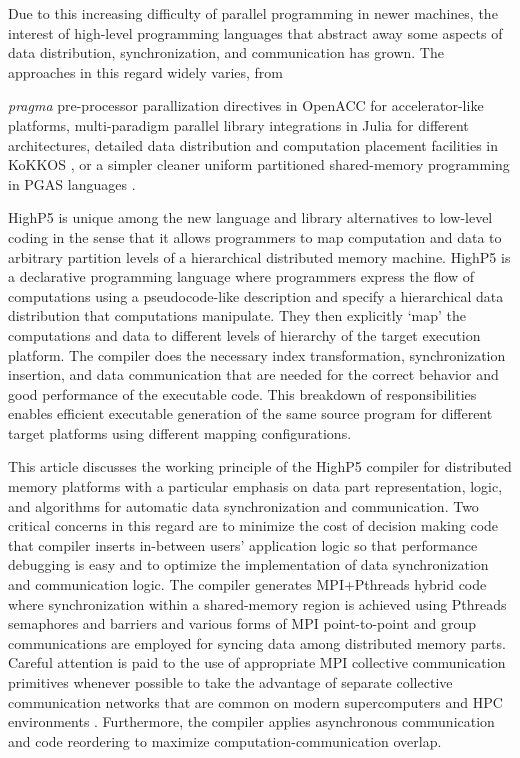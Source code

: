 \documentclass[ASNA,twocolumn]{USG} %
\begin{document}
Due to this increasing difficulty of parallel programming in newer machines, the interest of high-level programming languages that abstract away some aspects of data distribution, synchronization, and communication has grown. The approaches in this regard widely varies, from {\textit{pragma} pre-processor parallization directives in OpenACC \citep{farber2016parallel} for accelerator-like platforms, multi-paradigm parallel library integrations in Julia \citep{lin2021comparing} for different architectures, detailed data distribution and computation placement facilities in KoKKOS \citep{trott2021kokkos}, or a simpler cleaner uniform partitioned shared-memory programming in PGAS languages \citep{Yelick:2007:PPU:1278177.1278183}. 
	
    
HighP5 \citep{yanhaona2024highp5} is unique among the new language and library alternatives to low-level coding in the sense that it allows programmers to map computation and data to arbitrary partition levels of a hierarchical distributed memory machine. HighP5 is a declarative programming language where programmers express the flow of computations using a pseudocode-like description and specify a hierarchical data distribution that computations manipulate. They then explicitly `map' the computations and data to different levels of hierarchy of the target execution platform. The compiler does the necessary index transformation, synchronization insertion, and data communication that are needed for the correct behavior and good performance of the executable code. This breakdown of responsibilities enables efficient executable generation of the same source program for different target platforms using different mapping configurations.  
	
This article discusses the working principle of the HighP5 compiler for distributed memory platforms with a particular emphasis on data part representation, logic, and algorithms for automatic data synchronization and communication. Two critical concerns in this regard are to minimize the cost of decision making code that compiler inserts in-between users' application logic so that performance debugging is easy and to optimize the implementation of data synchronization and communication logic. The compiler generates MPI+Pthreads hybrid code where synchronization within a shared-memory region is achieved using Pthreads semaphores and barriers and various forms of MPI point-to-point and group communications are employed for syncing data among distributed memory parts. Careful attention is paid to the use of appropriate MPI collective communication primitives whenever possible to take the advantage of separate collective communication networks that are common on modern supercomputers \citep{10.1145/1088149.1088183} and HPC environments \citep{6490322}\citep{10.1145/329366.301116}. Furthermore, the compiler applies asynchronous communication and code reordering to maximize computation-communication overlap. 
	
}
\end{document}
